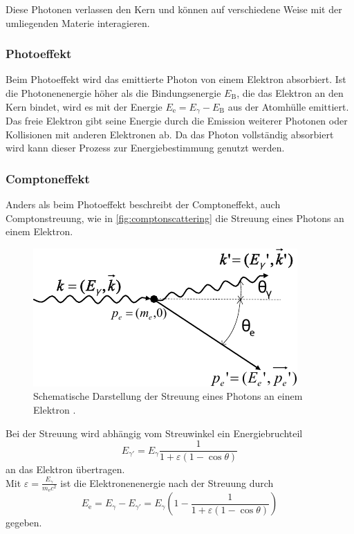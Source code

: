 Diese Photonen verlassen den Kern und können auf verschiedene Weise mit der umliegenden Materie interagieren.

\subsubsection{Photoeffekt}

Beim Photoeffekt wird das emittierte Photon von einem Elektron absorbiert.
Ist die Photonenenergie höher als die Bindungsenergie $E_\text{B}$, die das Elektron an den Kern bindet, wird es mit der Energie $E_\text{e} = E_\gamma - E_\text{B}$
aus der Atomhülle emittiert.
Das freie Elektron gibt seine Energie durch die Emission weiterer Photonen oder Kollisionen mit anderen Elektronen ab.
Da das Photon vollständig absorbiert wird kann dieser Prozess zur Energiebestimmung genutzt werden.

\subsubsection{Comptoneffekt}

Anders als beim Photoeffekt beschreibt der Comptoneffekt, auch Comptonstreuung, wie in \autoref{fig:comptonscattering} die Streuung eines Photons an einem Elektron.

\begin{figure}
    \centering
    \includegraphics{figures/compton.pdf}
    \caption{Schematische Darstellung der Streuung eines Photons an einem Elektron \cite{Teilchendetektoren}.}
    \label{fig:comptonscattering}
\end{figure}

Bei der Streuung wird abhängig vom Streuwinkel ein Energiebruchteil
\begin{equation}
    E_{\gamma'} = E_\gamma \frac{1}{1 + \varepsilon (1 - \cos\theta)}
    \label{eq:Egammaprime}
\end{equation}
an das Elektron übertragen. \\
Mit $\varepsilon = \frac{E_\gamma}{m_\text{e} c^2}$ ist die Elektronenenergie nach der Streuung durch
\begin{equation}
    E_\text{e} = E_\gamma -E_{\gamma'} = E_\gamma (1 - \frac{1}{1 + \varepsilon (1 - \cos\theta)}) 
\end{equation}
gegeben. \\

